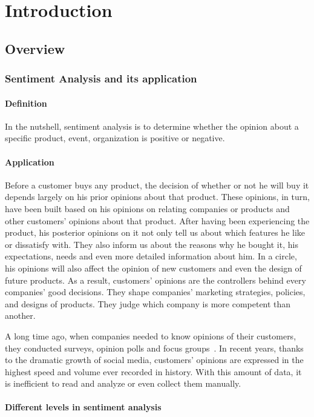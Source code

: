 \hypertarget{chap:intro}{\chapter{Introduction}}
\section{Overview}
\subsection{Sentiment Analysis and its application}
\subsubsection{Definition}
In the nutshell, sentiment analysis is to determine whether the opinion about a specific product, event, organization is positive or negative.

\subsubsection{Application}
Before a customer buys any product, the decision of whether or not he will buy it depends largely on his prior opinions about that product. 
These opinions, in turn, have been built based on his opinions on relating companies or products and other customers' opinions about that product.  
After having been experiencing the product, his posterior opinions on it not only tell us about which features he like or dissatisfy with.
They also inform us about the reasons why he bought it, his expectations, needs and even more detailed information about him.
In a circle, his opinions will also affect the opinion of new customers and even the design of future products.
As a result, customers' opinions are the controllers behind every companies' good decisions. 
They shape companies' marketing strategies, policies, and designs of products.
They judge which company is more competent than another.

A long time ago, when companies needed to know opinions of their customers, they conducted surveys, opinion polls and focus groups~\cite{liu2012sentiment}. 
In recent years, thanks to the dramatic growth of social media, customers' opinions are expressed in the highest speed and volume ever recorded in history.
With this amount of data, it is inefficient to read and analyze or even collect them manually.

\subsubsection{Different levels in sentiment analysis}
